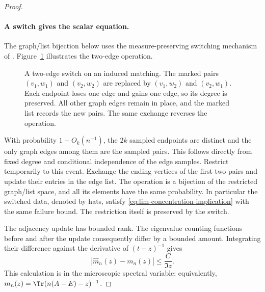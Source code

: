 \begin{proof}
\paragraph{A switch gives the scalar equation.}
The graph/list bijection below uses the measure-preserving switching
mechanism of \citet[Section~7.2, Propositions~7.3--7.4]{BauerschmidtHuangYauLocal}.
Figure~\ref{fig:two-edge-switch} illustrates the two-edge operation.
\begin{figure}[tbp]
 \centering
 
 \caption{A two-edge switch on an induced matching. The marked pairs
 \((v_1,w_1)\) and \((v_2,w_2)\) are replaced by
 \((v_1,w_2)\) and \((v_2,w_1)\). Each endpoint loses one edge and gains
 one edge, so its degree is preserved. All other graph edges remain in
 place, and the marked list records the new pairs. The same exchange
 reverses the operation.}
 \label{fig:two-edge-switch}
\end{figure}
With probability \(1-O_k(n^{-1})\), the \(2k\) sampled endpoints are
distinct and the only graph edges among them are the sampled pairs.
This follows directly from fixed degree and conditional independence
of the edge samples. Restrict temporarily to this event. Exchange the
ending vertices of the first two pairs and update their entries in the
edge list. The operation is a bijection of the restricted graph/list
space, and all its elements have the same probability. In particular
the switched data, denoted by hats, satisfy
\eqref{eq:lim-concentration-implication} with the same failure bound.
The restriction itself is preserved by the switch.

The adjacency update has bounded rank. The eigenvalue counting
functions before and after the update consequently differ by a bounded
amount. Integrating their difference against the derivative of
\((t-z)^{-1}\) gives
\begin{equation}\label{eq:lim-rank-trace}
 |\widehat m_n(z)-m_n(z)|\le \frac C{\Im z}.
\end{equation}
This calculation is in the microscopic spectral variable; equivalently,
\(m_n(z)=\Tr(n(A-E)-z)^{-1}\).


\end{proof}
